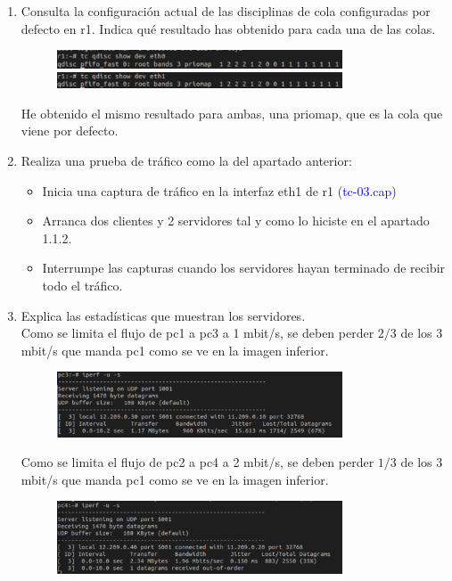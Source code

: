 \documentclass[12pt, a4paper]{report}
\begin{document}
\begin{enumerate}
	\item Consulta la configuración actual de las disciplinas de cola configuradas por defecto en r1. Indica
	qué resultado has obtenido para cada una de las colas.
	\begin{figure}[H]
		\centering
		\includegraphics[width=0.8\textwidth]{ej1.2_1_a}
		\includegraphics[width=0.8\textwidth]{ej1.2_1_b}
	\end{figure}
	He obtenido el mismo resultado para ambas, una priomap, que es la cola que viene por defecto.
	\item Realiza una prueba de tráfico como la del apartado anterior:
	\begin{itemize}
		\item Inicia una captura de tráfico en la interfaz eth1 de r1 (\textcolor{blue}{tc-03.cap})
		\item Arranca dos clientes y 2 servidores tal y como lo hiciste en el apartado 1.1.2.
		\item Interrumpe las capturas cuando los servidores hayan terminado de recibir todo el tráfico.
	\end{itemize}
	\item Explica las estadísticas que muestran los servidores.\\
	Como se limita el flujo de pc1 a pc3 a 1 mbit/s, se deben perder $2/3$ de los 3 mbit/s que manda pc1 como se ve en la imagen inferior.
	\begin{figure}[H]
		\centering
		\includegraphics[width=0.8\textwidth]{ej1.2_3_a}
	\end{figure}	
	Como se limita el flujo de pc2 a pc4 a 2 mbit/s, se deben perder $1/3$ de los 3 mbit/s que manda pc1 como se ve en la imagen inferior.
	\begin{figure}[H]
		\centering
		\includegraphics[width=0.8\textwidth]{ej1.2_3_b}

\end{figure}
\end{enumerate}
\end{document}
